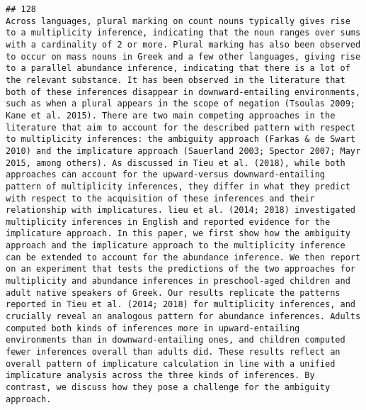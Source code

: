 \documentclass[
  english,
  man]{apa6}
\begin{document}
\begin{verbatim}
## 128                                                                                                                                                                                                                                                                                                                                                                                               Across languages, plural marking on count nouns typically gives rise to a multiplicity inference, indicating that the noun ranges over sums with a cardinality of 2 or more. Plural marking has also been observed to occur on mass nouns in Greek and a few other languages, giving rise to a parallel abundance inference, indicating that there is a lot of the relevant substance. It has been observed in the literature that both of these inferences disappear in downward-entailing environments, such as when a plural appears in the scope of negation (Tsoulas 2009; Kane et al. 2015). There are two main competing approaches in the literature that aim to account for the described pattern with respect to multiplicity inferences: the ambiguity approach (Farkas & de Swart 2010) and the implicature approach (Sauerland 2003; Spector 2007; Mayr 2015, among others). As discussed in Tieu et al. (2018), while both approaches can account for the upward-versus downward-entailing pattern of multiplicity inferences, they differ in what they predict with respect to the acquisition of these inferences and their relationship with implicatures. lieu et al. (2014; 2018) investigated multiplicity inferences in English and reported evidence for the implicature approach. In this paper, we first show how the ambiguity approach and the implicature approach to the multiplicity inference can be extended to account for the abundance inference. We then report on an experiment that tests the predictions of the two approaches for multiplicity and abundance inferences in preschool-aged children and adult native speakers of Greek. Our results replicate the patterns reported in Tieu et al. (2014; 2018) for multiplicity inferences, and crucially reveal an analogous pattern for abundance inferences. Adults computed both kinds of inferences more in upward-entailing environments than in downward-entailing ones, and children computed fewer inferences overall than adults did. These results reflect an overall pattern of implicature calculation in line with a unified implicature analysis across the three kinds of inferences. By contrast, we discuss how they pose a challenge for the ambiguity approach.

\end{verbatim}
\end{document}
